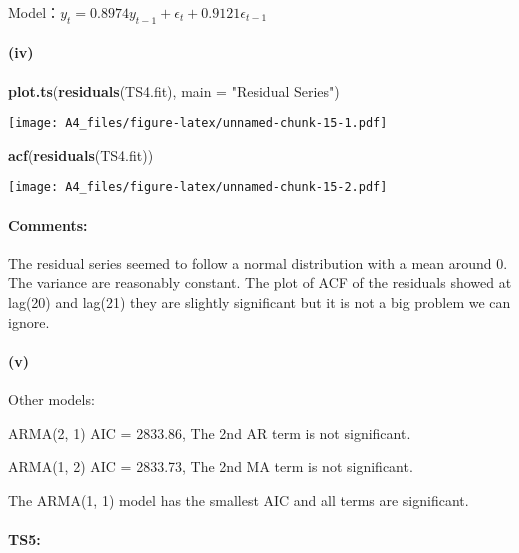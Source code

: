 \documentclass[]{article}
\newenvironment{Shaded}{\begin{snugshade}}{\end{snugshade}}
\newcommand{\DataTypeTok}[1]{\textcolor[rgb]{0.13,0.29,0.53}{#1}}
\newcommand{\KeywordTok}[1]{\textcolor[rgb]{0.13,0.29,0.53}{\textbf{#1}}}
\newcommand{\NormalTok}[1]{#1}
\newcommand{\StringTok}[1]{\textcolor[rgb]{0.31,0.60,0.02}{#1}}
\let\oldparagraph\paragraph
\renewcommand{\paragraph}[1]{\oldparagraph{#1}\mbox{}}
\begin{document}
Model：\(y_t = 0.8974y_{t-1} + \epsilon_t + 0.9121\epsilon_{t-1}\)

\hypertarget{iv-3}{%
\paragraph{(iv)}\label{iv-3}}

\begin{Shaded}
\begin{Highlighting}[]
\KeywordTok{plot.ts}\NormalTok{(}\KeywordTok{residuals}\NormalTok{(TS4.fit), }\DataTypeTok{main =} \StringTok{"Residual Series"}\NormalTok{)}
\end{Highlighting}
\end{Shaded}

\texttt{[image: A4\_files/figure-latex/unnamed-chunk-15-1.pdf]}

\begin{Shaded}
\begin{Highlighting}[]
\KeywordTok{acf}\NormalTok{(}\KeywordTok{residuals}\NormalTok{(TS4.fit))}
\end{Highlighting}
\end{Shaded}

\texttt{[image: A4\_files/figure-latex/unnamed-chunk-15-2.pdf]}

\hypertarget{comments-4}{%
\paragraph{Comments:}\label{comments-4}}

The residual series seemed to follow a normal distribution with a mean
around 0. The variance are reasonably constant. The plot of ACF of the
residuals showed at lag(20) and lag(21) they are slightly significant
but it is not a big problem we can ignore.

\hypertarget{v-3}{%
\paragraph{(v)}\label{v-3}}

Other models:

ARMA(2, 1) AIC = 2833.86, The 2nd AR term is not significant.

ARMA(1, 2) AIC = 2833.73, The 2nd MA term is not significant.

The ARMA(1, 1) model has the smallest AIC and all terms are significant.

\hypertarget{ts5}{%
\paragraph{TS5:}\label{ts5}}
\end{document}
